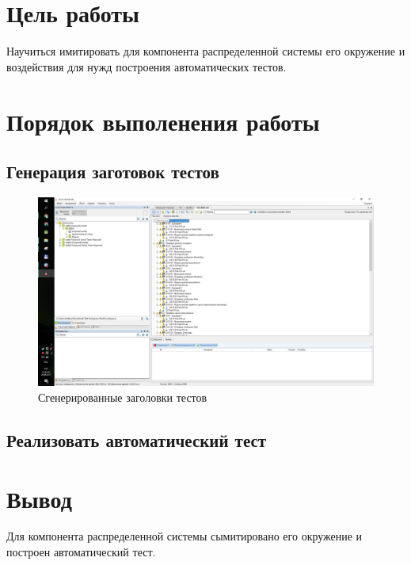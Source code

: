 \section{Цель работы}
	Научиться имитировать для компонента распределенной системы его окружение и воздействия для нужд построения автоматических тестов.
		
\section{Порядок выполенения работы}
	\subsection{Генерация заготовок тестов}
		\begin{figure}[h]
			\centering
			\includegraphics[width=\linewidth]{images/tests}
			\caption{Сгенерированные заголовки тестов}
			\label{fig:tests}
		\end{figure}
		
	\newpage
	\subsection{Реализовать автоматический тест}
		
		
\section{Вывод}
	Для компонента распределенной системы сымитировано его окружение и построен автоматический тест.